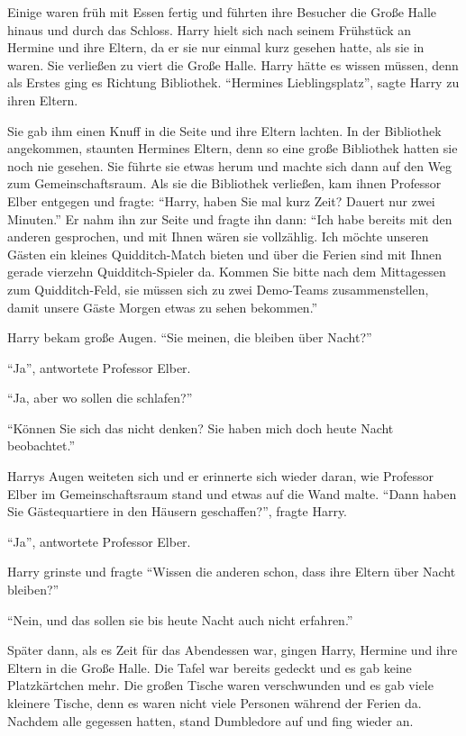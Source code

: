 Einige waren früh mit Essen fertig und führten ihre Besucher die Große Halle hinaus und durch das Schloss. Harry hielt sich nach seinem Frühstück an Hermine und ihre Eltern, da er sie nur einmal kurz gesehen hatte, als sie in \fab waren. Sie verließen zu viert die Große Halle. Harry hätte es wissen müssen, denn als Erstes ging es Richtung Bibliothek. \enquote{Hermines Lieblingsplatz}, sagte Harry zu ihren Eltern.

Sie gab ihm einen Knuff in die Seite und ihre Eltern lachten. In der Bibliothek angekommen, staunten Hermines Eltern, denn so eine große Bibliothek hatten sie noch nie gesehen. Sie führte sie etwas herum und machte sich dann auf den Weg zum Gemeinschaftsraum.
Als sie die Bibliothek verließen, kam ihnen Professor Elber entgegen und fragte: \enquote{Harry, haben Sie mal kurz Zeit? Dauert nur zwei Minuten.} Er nahm ihn zur Seite und fragte ihn dann: \enquote{Ich habe bereits mit den anderen gesprochen, und mit Ihnen wären sie vollzählig. Ich möchte unseren Gästen ein kleines Quidditch-Match bieten und über die Ferien sind mit Ihnen gerade vierzehn Quidditch-Spieler da. Kommen Sie bitte nach dem Mittagessen zum Quidditch-Feld, sie müssen sich zu zwei Demo-Teams zusammenstellen, damit unsere Gäste Morgen etwas zu sehen bekommen.}

Harry bekam große Augen. \enquote{Sie meinen, die bleiben über Nacht?}

\enquote{Ja}, antwortete Professor Elber.

\enquote{Ja, aber wo sollen die schlafen?}

\enquote{Können Sie sich das nicht denken? Sie haben mich doch heute Nacht beobachtet.}

Harrys Augen weiteten sich und er erinnerte sich wieder daran, wie Professor Elber im Gemeinschaftsraum stand und etwas auf die Wand malte. \enquote{Dann haben Sie Gästequartiere in den Häusern geschaffen?}, fragte Harry.

\enquote{Ja}, antwortete Professor Elber.

Harry grinste und fragte \enquote{Wissen die anderen schon, dass ihre Eltern über Nacht bleiben?}

\enquote{Nein, und das sollen sie bis heute Nacht auch nicht erfahren.}

Später dann, als es Zeit für das Abendessen war, gingen Harry, Hermine und ihre Eltern in die Große Halle. Die Tafel war bereits gedeckt und es gab keine Platzkärtchen mehr. Die großen Tische waren verschwunden und es gab viele kleinere Tische, denn es waren nicht viele Personen während der Ferien da. Nachdem alle gegessen hatten, stand Dumbledore auf und fing wieder an.

